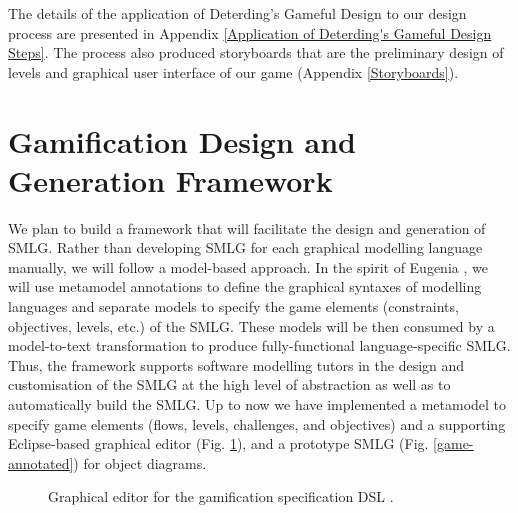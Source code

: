 \documentclass[12pt, a4paper]{report}
\begin{document}
The details of the application of Deterding's Gameful Design to our design process are presented in Appendix \ref{Application of Deterding's Gameful Design Steps}. The process also produced storyboards that are the preliminary design of levels and graphical user interface of our game (Appendix \ref{Storyboards}).      

\section{Gamification Design and Generation Framework}
We plan to build a framework that will facilitate the design and generation of SMLG. Rather than developing SMLG for each graphical modelling language manually, we will follow a model-based approach. In the spirit of Eugenia \cite{kolovos2015eugenia}, we will use metamodel annotations to define the graphical syntaxes of modelling languages and separate models to specify the game elements (constraints, objectives, levels, etc.) of the SMLG. These models will be then consumed by a model-to-text transformation to produce fully-functional language-specific SMLG. Thus, the framework supports software modelling tutors in the design and customisation of the SMLG at the high level of abstraction as well as to automatically build the SMLG. Up to now we have implemented a metamodel to specify game elements (flows, levels, challenges, and objectives) and a supporting Eclipse-based graphical editor (Fig. \ref{editor}), and a prototype SMLG (Fig. \ref{game-annotated}) for object diagrams. 

\begin{figure}[ht]
\centering
{}
\caption{Graphical editor for the gamification specification DSL \cite{Yohannis2016}.}
\label{editor}
\end{figure}
\end{document}
